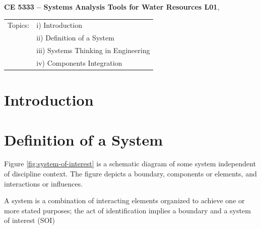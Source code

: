 \documentclass[11pt]{article}
\begin{document}
\begin{center}
{\textbf{{ CE 5333 -- Systems Analysis Tools for Water Resources}  {L01}}},
\end{center}
\begingroup
\begin{tabular}{p{1in} p{5in}}
Topics: & i) Introduction \\

~ & ii) Definition of a System \\
~ & iii) Systems Thinking in Engineering \\
~ & iv) Components Integration \\
\end{tabular}
\endgroup
\section{Introduction}
\section{Definition of a System}
Figure \ref{fig:system-of-interest} is a schematic diagram of some system independent of discipline context.
The figure depicts a boundary, components or elements, and interactions or influences.

A system is a combination of interacting elements organized to achieve one or more stated purposes; 
the act of identification implies a boundary and a system of interest (SOI) \citep{Faulconbridge2019}
\end{document}

